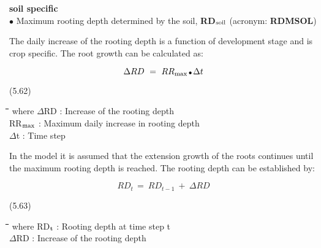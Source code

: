 \documentclass[11pt]{article}
\begin{document}
{\bf soil specific}\\
$\bullet$ Maximum rooting depth determined by the soil, {\bf RD$_{{\rm soil}}$} (acronym: {\bf RDMSOL})

\bigskip
\bigskip
The daily increase of the rooting depth is a function of development stage and is crop
specific. The root growth can be calculated as:

\begin{displaymath}
\Delta RD~=~RR _{\max } \, {\rm \Bullet{0.75ex}}\, \Delta t
\end{displaymath}

 \bigskip
\strut\hfill (5.62)
\nwln
\begin{tabbing}
\hspace{1.27cm}\=\hspace{1.27cm}\=\hspace{1.27cm}\=\hspace{1.27cm}\=%
\hspace{1.27cm}\=\hspace{1.27cm}\=\hspace{1.27cm}\=\hspace{1.27cm}\=%
\hspace{1.27cm}\=\hspace{1.27cm}\=\kill
where\> $\Delta$RD\> : Increase of the rooting depth \> \> \> \> \> \> \> \> [cm]\\
\>RR$_{{\rm max}}$\> : Maximum daily increase in rooting depth \> \> \> \> \> \> \> \> [cm d$^{{\rm -}{1}}$]\\
\>$\Delta$t\> : Time step \> \> \> \> \> \> \> \> [d]
\end{tabbing}

\bigskip
\bigskip
\bigskip
\bigskip
 In the model it is assumed that the extension growth of the roots continues until the
maximum rooting depth is reached. The rooting depth can be established by:

\begin{displaymath}
RD _{t~} =~RD _{t-1} ~+~\Delta RD
\end{displaymath}

 \bigskip
\strut\hfill (5.63)
\nwln
\begin{tabbing}
\hspace{1.27cm}\=\hspace{1.27cm}\=\hspace{1.27cm}\=\hspace{1.27cm}\=%
\hspace{1.27cm}\=\hspace{1.27cm}\=\hspace{1.27cm}\=\hspace{1.27cm}\=%
\hspace{1.27cm}\=\hspace{1.27cm}\=\kill
where\> RD$_{{\rm t}}$\> : Rooting depth at time step t\> \> \> \> \> \> \> \> [cm]\\
\>$\Delta$RD\> : Increase of the rooting depth \> \> \> \> \> \> \> \> [cm]
\end{tabbing}
\end{document}
